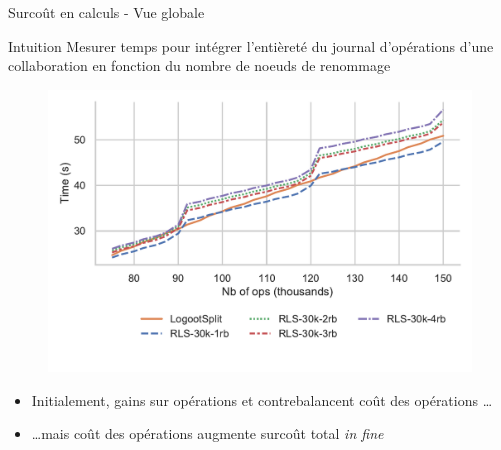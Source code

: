 \begin{frame}{Surcoût en calculs - Vue globale}
    \begin{block}{Intuition}
        Mesurer temps pour intégrer l'entièreté du journal d'opérations d'une collaboration en fonction du \alert{nombre de noeuds de renommage}
    \end{block}
    \pause
    \vspace{-0.5cm}
    \begin{figure}[!ht]
        \includegraphics[width=0.8 \columnwidth]{img/replay-log-30k-2022-12-09}
      \end{figure}
    \vspace{-1cm}
    \pause
    \begin{itemize}
        \item Initialement, gains sur opérations \ins et \rmv contrebalancent coût des opérations \ren \dots
        \item \dots mais coût des opérations \ren augmente surcoût total \emph{in fine}
    \end{itemize}
\end{frame}
